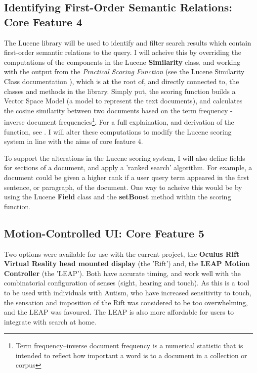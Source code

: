 \documentclass[a4paper, 10pt]{article}
\begin{document}
\subsection{Identifying First-Order Semantic Relations: Core Feature 4}\label{apache}
The Lucene library will be used to identify and filter search results which contain first-order semantic relations to the query. I will acheive this by overriding the computations of the components in the Lucene \textbf{Similarity} class, and working with the output from the \textit{Practical Scoring Function} (see the Lucene Similarity Class documentation \cite{similarity}), which is at the root of, and directly connected to, the classes and methods in the library. Simply put, the scoring function builds a Vector Space Model (a model to represent the text documents), and calculates the cosine similarity between two documents based on the term frequency - inverse document frequencies\footnote{Term frequency–inverse document frequency is a numerical statistic that is intended to reflect how important a word is to a document in a collection or corpus}. For a full explaination, and derivation of the function, see \cite{similarity}. I will alter these computations to modify the Lucene scoring system in line with the aims of core feature 4. 

To support the alterations in the Lucene scoring system, I will also define fields for sections of a document, and apply a 'ranked search' algorithm. For example, a document could be given a higher rank if a user query term appeared in the first sentence, or paragraph, of the document. One way to acheive this would be by using the Lucene \textbf{Field} class and the \textbf{setBoost} method within the scoring function. 

\subsection{Motion-Controlled UI: Core Feature 5}\label{hardware}
Two options were available for use with the current project, the \textbf{Oculus Rift Virtual Reality head mounted display} (the 'Rift') and, the \textbf{LEAP Motion Controller} (the 'LEAP'). Both have accurate timing, and work well with the combinatorial configuration of senses (sight, hearing and touch). As this is a tool to be used with individuals with Autism, who have increased sensitivity to touch, the sensation and imposition of the Rift was considered to be too overwhelming, and the LEAP was favoured. The LEAP is also more affordable for users to integrate with search at home. 
\end{document}
